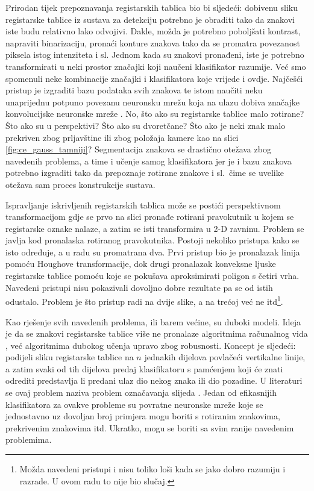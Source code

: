 \documentclass[times, utf8, diplomski]{fer}
\begin{document}
Prirodan tijek prepoznavanja registarskih tablica bio bi sljedeći: dobivenu sliku registarske tablice iz sustava za detekciju potrebno je obraditi tako da znakovi iste budu relativno lako odvojivi. Dakle, možda je potrebno poboljšati kontrast, napraviti binarizaciju, pronaći konture znakova tako da se promatra povezanost piksela istog intenziteta i sl. Jednom kada su znakovi pronađeni, iste je potrebno transformirati u neki prostor značajki koji naučeni klasifikator razumije. Već smo spomenuli neke kombinacije značajki i klasifikatora koje vrijede i ovdje. Najčešći pristup je izgraditi bazu podataka svih znakova te istom naučiti neku unaprijednu potpuno povezanu neuronsku mrežu koja na ulazu dobiva značajke konvolucijske neuronske mreže \citep{zemris}. No, što ako su registarske tablice malo rotirane? Što ako su u perspektivi? Što ako su dvoretčane? Što ako je neki znak malo prekriven zbog prljavštine ili zbog položaja kamere kao na slici \ref{fig:ce_gauss_tamniji}? Segmentacija znakova se drastično otežava zbog navedenih problema, a time i učenje samog klasifikatora jer je i bazu znakova potrebno izgraditi tako da prepoznaje rotirane znakove i sl.\ čime se uvelike otežava sam proces konstrukcije sustava.

Ispravljanje iskrivljenih  registarskih tablica može se postići perspektivnom transformacijom  gdje se prvo na slici pronađe rotirani pravokutnik u kojem se registarske oznake nalaze, a zatim se isti transformira u 2-D ravninu. Problem se javlja kod pronalaska rotiranog pravokutnika. Postoji nekoliko pristupa kako se isto određuje, a u radu su promatrana dva. Prvi pristup bio je pronalazak linija pomoću Houghove transformacije, dok drugi pronalazak konveksne ljuske  registarske tablice pomoću koje se pokušava aproksimirati poligon s četiri vrha. Navedeni pristupi nisu pokazivali dovoljno dobre rezultate pa se od istih odustalo. Problem je što pristup radi na dvije slike, a na trećoj već ne itd\footnote{Možda navedeni pristupi i nisu toliko loši kada se jako dobro razumiju i razrade. U ovom radu to nije bio slučaj.}.

Kao rješenje svih navedenih problema, ili barem većine, su duboki modeli. Ideja je da se znakovi registarske tablice više ne pronalaze algoritmima računalnog vida , već algoritmima dubokog učenja  upravo zbog robusnosti. Koncept je sljedeći: podijeli sliku registarske tablice na $n$ jednakih dijelova povlačeći vertikalne linije, a zatim svaki od tih dijelova predaj klasifikatoru s pamćenjem koji će znati odrediti predstavlja li predani ulaz dio nekog znaka ili dio pozadine. U literaturi se ovaj problem naziva problem označavanja slijeda . Jedan od efikasnijih klasifikatora za ovakve probleme su povratne neuronske mreže  koje se jednostavno uz dovoljan broj primjera mogu boriti s rotiranim znakovima, prekrivenim znakovima itd. Ukratko, mogu se boriti sa svim ranije navedenim problemima.
\end{document}
